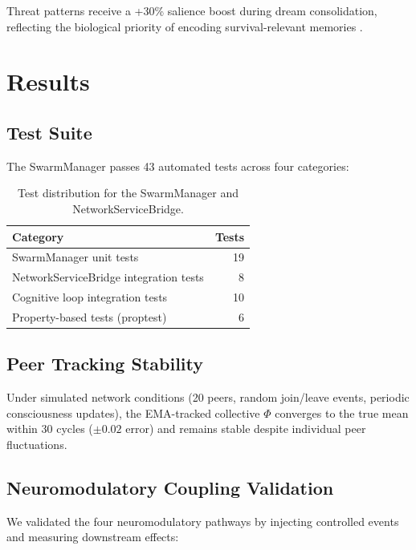 \documentclass[11pt,a4paper]{article}
\begin{document}
Threat patterns receive a +30\% salience boost during dream consolidation, reflecting the biological priority of encoding survival-relevant memories \citep{walker2017}.

\section{Results}

\subsection{Test Suite}

The SwarmManager passes 43 automated tests across four categories:

\begin{table}[h]
\centering
\caption{Test distribution for the SwarmManager and NetworkServiceBridge.}
\label{tab:swarm_tests}
\begin{tabular}{lr}
\toprule
\textbf{Category} & \textbf{Tests} \\
\midrule
SwarmManager unit tests & 19 \\
NetworkServiceBridge integration tests & 8 \\
Cognitive loop integration tests & 10 \\
Property-based tests (proptest) & 6 \\
\bottomrule
\end{tabular}
\end{table}

\subsection{Peer Tracking Stability}

Under simulated network conditions (20 peers, random join/leave events, periodic consciousness updates), the EMA-tracked collective $\Phi$ converges to the true mean within 30 cycles ($\pm 0.02$ error) and remains stable despite individual peer fluctuations.

\subsection{Neuromodulatory Coupling Validation}

We validated the four neuromodulatory pathways by injecting controlled events and measuring downstream effects:
\end{document}
